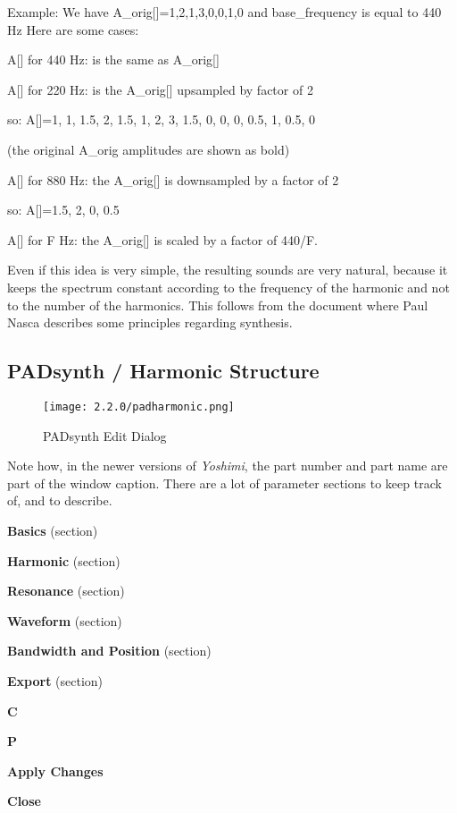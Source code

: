    Example:
   We have A\_orig[]={1,2,1,3,0,0,1,0} and base\_frequency is equal to 440 Hz
   Here are some cases:

   A[] for 440 Hz: is the same as A\_orig[]

   A[] for 220 Hz: is the A\_orig[] upsampled by factor of 2

   so: A[]={1, 1, 1.5, 2, 1.5, 1, 2, 3, 1.5, 0, 0, 0, 0.5, 1, 0.5, 0}

   (the original A\_orig amplitudes are shown as bold)

   A[] for 880 Hz: the A\_orig[] is downsampled by a factor of 2

   so: A[]={1.5, 2, 0, 0.5}

   A[] for F Hz: the A\_orig[] is scaled by a factor of 440/F.

   Even if this idea is very simple, the resulting sounds are very natural,
   because it keeps the spectrum constant according to the frequency of the
   harmonic and not to the number of the harmonics. This follows from the
   document where Paul Nasca describes some principles regarding synthesis.

\subsection{PADsynth / Harmonic Structure}
\label{subsec:padsynth_harmonic_structure}

\begin{figure}[H]
   \centering
   \texttt{[image: 2.2.0/padharmonic.png]}
   \caption{PADsynth Edit Dialog}
   \label{fig:padsynth_edit_dialog}
\end{figure}

   Note how, in the newer versions of \textsl{Yoshimi}, the
   part number and part name are part of the window caption.
   There are a lot of parameter sections to keep track of, and to describe.

   \begin{enumber}
      \item \textbf{Basics} (section)
      \item \textbf{Harmonic} (section)
      \item \textbf{Resonance} (section)
      \item \textbf{Waveform} (section)
      \item \textbf{Bandwidth and Position} (section)
      \item \textbf{Export} (section)
      \item \textbf{C}
      \item \textbf{P}
      \item \textbf{Apply Changes}
      \item \textbf{Close}
   \end{enumber}

